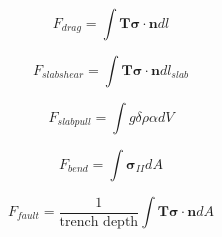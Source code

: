 \documentclass[12pt]{article}
\newcommand{\ssigma}{{\ensuremath{\boldsymbol{\sigma}}}}
\begin{document}
{\begin{equation}
F_{drag} = \int \textbf{T}\ssigma \cdot \textbf{n} dl
\end{equation}

\begin{equation}
F_{slabshear} = \int \textbf{T}\ssigma \cdot \textbf{n} dl_{slab}
\end{equation}

\begin{equation}
F_{slabpull} = \int g\delta \rho \alpha dV
\end{equation} 
 
\begin{equation}
F_{bend} = \int \ssigma_{II} dA
\end{equation} 

\begin{equation}
F_{fault} = \frac{1}{\text{trench depth}}\int \textbf{T}\ssigma\cdot\textbf{n} dA
\end{equation} 
 
}
\end{document}
